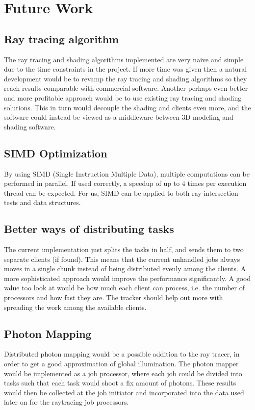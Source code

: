 % 

\chapter{Future Work}
\section{Ray tracing algorithm}
The ray tracing and shading algorithms implemented are very naive and simple due to the time constraints in the project. If more time was given then a natural development would be to revamp the ray tracing and shading algorithms so they reach results comparable with commercial software. Another perhaps even better and more profitable approach would be to use existing ray tracing and shading solutions. This in turn would decouple the shading and clients even more, and the software could instead be viewed as a middleware between 3D modeling and shading software.

\section{SIMD Optimization}
By using SIMD (Single Instruction Multiple Data), multiple computations can be performed in parallel. If used correctly, a speedup of up to 4 times per execution thread can be expected. For us, SIMD can be applied to both ray intersection tests and data structures.

\section{Better ways of distributing tasks}
The current implementation just splits the tasks in half, and sends them to two separate clients (if found).
This means that the current unhandled jobs always moves in a single chunk instead of being distributed evenly among the clients.
A more sophisticated approach would improve the performance significantly. A good value too look at would be how much each client can process, i.e. the number of processors and how fast they are.
The tracker should help out more with spreading the work among the available clients.

\section{Photon Mapping}
Distributed photon mapping would be a possible addition to the ray tracer, in order to get a good approximation of global illumination. The photon mapper would be implemented as a job processor, where each job could be divided into tasks such that each task would shoot a fix amount of photons. These results would then be collected at the job initiator and incorporated into the data used later on for the raytracing job processors.

